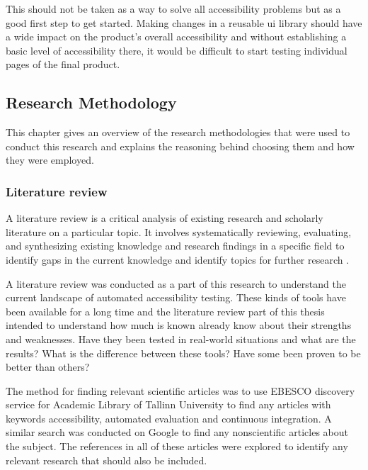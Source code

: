 \documentclass{master_thesis}
\begin{document}
This should not be taken as a way to solve all accessibility problems but as a good first step to get started. Making changes in a reusable \ac{ui} library should have a wide impact on the product's overall accessibility and without establishing a basic level of accessibility there, it would be difficult to start testing individual pages of the final product.

\subsection{Research Methodology}


This chapter gives an overview of the research methodologies that were used to conduct this research and explains the reasoning behind choosing them and how they were employed.

\subsubsection{Literature review}

A literature review is a critical analysis of existing research and scholarly literature on a particular topic. It involves systematically reviewing, evaluating, and synthesizing existing knowledge and research findings in a specific field to identify gaps in the current knowledge and identify topics for further research \citep{Luft2022}.

A literature review was conducted as a part of this research to understand the current landscape of automated accessibility testing. These kinds of tools have been available for a long time and the literature review part of this thesis intended to understand how much is known already know about their strengths and weaknesses. Have they been tested in real-world situations and what are the results? What is the difference between these tools? Have some been proven to be better than others?

The method for finding relevant scientific articles was to use EBESCO discovery service for Academic Library of Tallinn University to find any articles with keywords accessibility, automated evaluation and continuous integration. A similar search was conducted on Google to find any nonscientific articles about the subject. The references in all of these articles were explored to identify any relevant research that should also be included.
\end{document}
